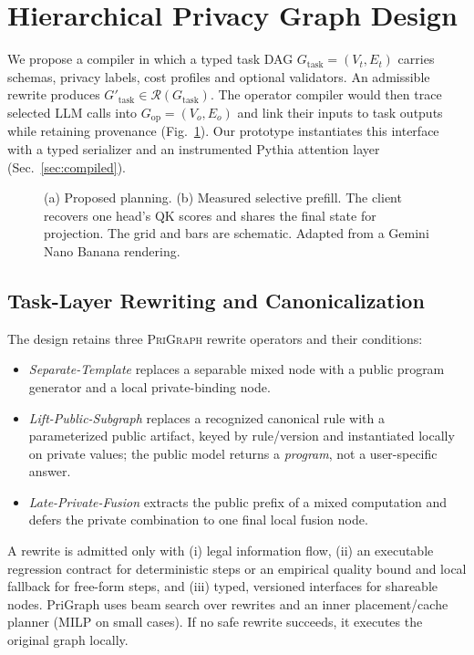 \documentclass[runningheads]{llncs}
\newcommand{\Gt}{G_{\mathrm{task}}}
\newcommand{\Go}{G_{\mathrm{op}}}
\newcommand{\Gtnew}{G'_{\mathrm{task}}}
\newcommand{\srcA}{\textsc{PriGraph}}
\begin{document}
\section{Hierarchical Privacy Graph Design}
We propose a compiler in which a typed task DAG $\Gt=(V_t,E_t)$ carries
schemas, privacy labels, cost profiles and optional validators. An
admissible rewrite produces $\Gtnew\in\mathcal{R}(\Gt)$. The operator
compiler would then trace selected LLM calls into $\Go=(V_o,E_o)$ and
link their inputs to task outputs while retaining provenance
(Fig.~\ref{fig:arch}). Our prototype instantiates this interface with a
typed serializer and an instrumented Pythia attention layer
(Sec.~\ref{sec:compiled}).

\begin{figure}[t]
\centering

\caption{(a) Proposed planning. (b) Measured selective prefill. The client
recovers one head's QK scores and shares the final state for projection.
The grid and bars are schematic. Adapted from a Gemini Nano Banana rendering.}
\label{fig:arch}
\end{figure}

\subsection{Task-Layer Rewriting and Canonicalization}
The design retains three \srcA{} rewrite operators and their conditions:
\begin{itemize}
\item \emph{Separate-Template} replaces a separable mixed node with a public program generator and a local private-binding node.
\item \emph{Lift-Public-Subgraph} replaces a recognized canonical rule with a parameterized public artifact, keyed by rule/version and instantiated locally on private values; the public model returns a \emph{program}, not a user-specific answer.
\item \emph{Late-Private-Fusion} extracts the public prefix of a mixed computation and defers the private combination to one final local fusion node.
\end{itemize}
A rewrite is admitted only with (i) legal information flow, (ii) an executable regression contract for deterministic steps or an empirical quality bound and local fallback for free-form steps, and (iii) typed, versioned interfaces for shareable nodes. PriGraph uses beam search over rewrites and an inner placement/cache planner (MILP on small cases). If no safe rewrite succeeds, it executes the original graph locally.
\end{document}
